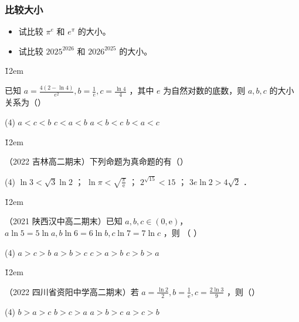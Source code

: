 \subsubsection{比较大小}

\begin{problem}
\begin{itemize}
    \item 试比较 $\pi^e$ 和 $e^\pi$ 的大小。
    \item 试比较 $2025^{2026}$ 和 $2026^{2025}$ 的大小。
\end{itemize}
\end{problem}

\v{12em}

\begin{example}
    已知 $a=\frac{4(2-\ln 4)}{e^2}, b=\frac{1}{e}, c=\frac{\ln 4}{4}$ ，其中 $e$ 为自然对数的底数，则 $a, b, c$ 的大小关系为（\quad）
    \begin{tasks}(4)
        \task $a<c<b$
        \task $c<a<b$
        \task $a<b<c$
        \task $b<a<c$
    \end{tasks}
\end{example}

\v{12em}

\begin{example}
    （2022 吉林高二期末）下列命题为真命题的有（\quad）
    \begin{tasks}(4)
        \task $\ln 3<\sqrt{3} \ln 2$ ；
        \task $\ln \pi<\sqrt{\frac{\pi}{\mathrm{e}}}$ ；
        \task $2^{\sqrt{15}}<15$ ；
        \task $3 e \ln 2>4 \sqrt{2}$ ．
    \end{tasks}
\end{example}

\v{12em}

\begin{example}
    （2021 陕西汉中高二期末）已知 $a, b, c \in (0, \mathrm{e})$，$a \ln 5=5 \ln a, b \ln 6= 6 \ln b, c \ln 7=7 \ln c$ ，则 （ \quad）
    \begin{tasks}(4)
        \task $a>c>b$
        \task $a>b>c$
        \task $c>a>b$
        \task $c>b>a$
    \end{tasks}
\end{example}

\v{12em}

\begin{example}
    （2022 四川省资阳中学高二期末）若 $a=\frac{\ln 2}{2}, b=\frac{1}{\mathrm{e}}, c=\frac{2 \ln 3}{9}$ ，则（\quad ）
    \begin{tasks}(4)
        \task $b>a>c$
        \task $b>c>a$
        \task $a>b>c$
        \task $a>c>b$
    \end{tasks}
\end{example}

